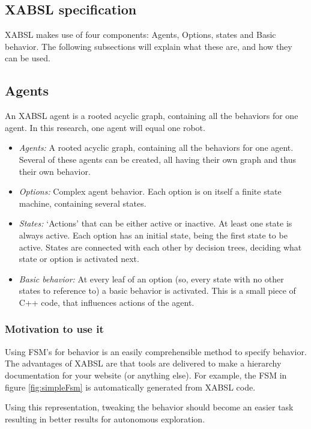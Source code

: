 \documentclass[a4paper,10pt]{article}
\begin{document}
\subsection{XABSL specification}
XABSL makes use of four components: Agents, Options, states and Basic behavior.
The following subsections will explain what these are, and how they can be used.

\subsection{Agents}
An XABSL agent is a rooted acyclic graph, containing all the behaviors for one
agent. In this research, one agent will equal one robot. 



\begin{itemize}
\item \emph{Agents:} A rooted acyclic graph, containing all the behaviors for one
agent. Several of these agents can be created, all having their own graph and
thus their own behavior.
\item \emph{Options:} Complex agent behavior. Each option is on itself a finite
state machine, containing several states.
\item \emph{States:} `Actions' that can be either active or inactive. At least
one state is always active. Each option has an initial state, being the first
state to be active. States are connected with each other by decision trees,
deciding what state or option is activated next.
\item \emph{Basic behavior:} At every leaf of an option (so, every state with no
other states to reference to) a basic behavior is activated. This is a small
piece of C++ code, that influences actions of the agent. 
\end{itemize}



\subsubsection{Motivation to use it}
Using FSM's for behavior is an easily comprehensible method to specify behavior.
The advantages of XABSL are that tools are delivered to make a hierarchy
documentation for your website (or anything else). For example, the FSM in
figure \ref{fig:simpleFsm} is automatically generated from XABSL code.

Using this representation, tweaking the behavior should become an easier task
resulting in better results for autonomous exploration.
\end{document}
